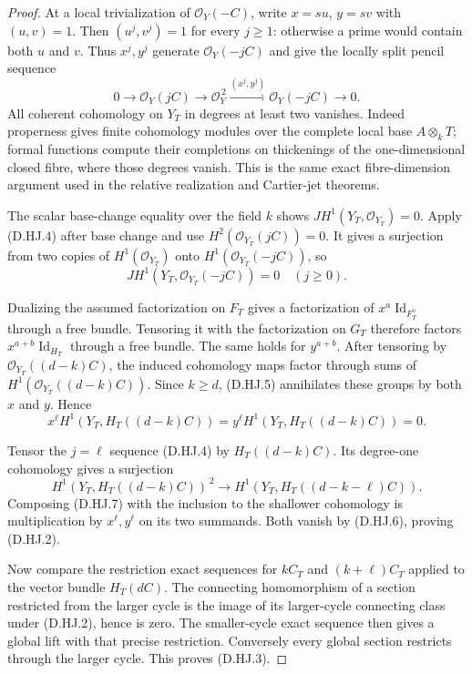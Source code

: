 \begin{proof}
At a local trivialization of $\mathcal O_Y(-C)$, write
$x=su$, $y=sv$ with $(u,v)=1$. Then $(u^j,v^j)=1$ for every
$j\ge1$: otherwise a prime would contain both $u$ and $v$.
Thus $x^j,y^j$ generate $\mathcal O_Y(-jC)$ and give the
locally split pencil sequence
\[
 0\longrightarrow\mathcal O_Y(jC)
 \longrightarrow\mathcal O_Y^{\,2}
 \xrightarrow{(x^j,y^j)}\mathcal O_Y(-jC)
 \longrightarrow0.                                    \tag{D.HJ.4}
\]
All coherent cohomology on $Y_T$ in degrees at least two
vanishes. Indeed properness gives finite cohomology modules
over the complete local base $A\otimes_kT$; formal functions
compute their completions on thickenings of the one-dimensional
closed fibre, where those degrees vanish. This is the same
exact fibre-dimension argument used in the relative realization
and Cartier-jet theorems.

The scalar base-change equality over the field $k$ shows
$JH^1(Y_T,\mathcal O_{Y_T})=0$. Apply (D.HJ.4) after base
change and use $H^2(\mathcal O_{Y_T}(jC))=0$. It gives a
surjection from two copies of $H^1(\mathcal O_{Y_T})$ onto
$H^1(\mathcal O_{Y_T}(-jC))$, so
\[
       JH^1(Y_T,\mathcal O_{Y_T}(-jC))=0
                              \quad(j\ge0).             \tag{D.HJ.5}
\]

Dualizing the assumed factorization on $F_T$ gives a
factorization of $x^a\operatorname{Id}_{F_T^\vee}$ through
a free bundle. Tensoring it with the factorization on $G_T$
therefore factors $x^{a+b}\operatorname{Id}_{H_T}$ through
a free bundle. The same holds for $y^{a+b}$. After tensoring
by $\mathcal O_{Y_T}((d-k)C)$, the induced cohomology maps
factor through sums of
$H^1(\mathcal O_{Y_T}((d-k)C))$. Since $k\ge d$, (D.HJ.5)
annihilates these groups by both $x$ and $y$. Hence
\[
 x^\ell H^1(Y_T,H_T((d-k)C))
 =y^\ell H^1(Y_T,H_T((d-k)C))=0.                         \tag{D.HJ.6}
\]

Tensor the $j=\ell$ sequence (D.HJ.4) by
$H_T((d-k)C)$. Its degree-one cohomology gives a surjection
\[
 H^1(Y_T,H_T((d-k)C))^{\,2}
       \longrightarrow H^1(Y_T,H_T((d-k-\ell)C)).
                                                        \tag{D.HJ.7}
\]
Composing (D.HJ.7) with the inclusion to the shallower
cohomology is multiplication by $x^\ell,y^\ell$ on its two
summands. Both vanish by (D.HJ.6), proving (D.HJ.2).

Now compare the restriction exact sequences for $kC_T$ and
$(k+\ell)C_T$ applied to the vector bundle $H_T(dC)$.
The connecting homomorphism of a section restricted from
the larger cycle is the image of its larger-cycle connecting
class under (D.HJ.2), hence is zero. The smaller-cycle exact
sequence then gives a global lift with that precise restriction.
Conversely every global section restricts through the larger
cycle. This proves (D.HJ.3).


\end{proof}
